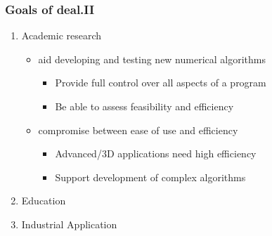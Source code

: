 \begin{frame}
  \frametitle{Goals of deal.II}
  \begin{enumerate}
    \item<+-> Academic research
  \begin{itemize}
  \item aid developing and testing new numerical algorithms
    \begin{itemize}
    \item Provide full control over all aspects of a program
    \item Be able to assess feasibility and efficiency
    \end{itemize}
  \item compromise between ease of use and efficiency
    \begin{itemize}
    \item Advanced/3D applications need high efficiency
    \item Support development of complex algorithms
    \end{itemize}
  \end{itemize}  
  \item<+-> Education
  \item<+-> Industrial Application
  \end{enumerate}
\end{frame}

